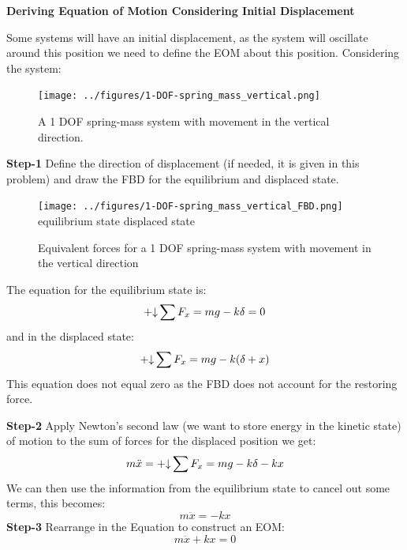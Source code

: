 \documentclass[12pt,letter]{article}
\begin{document}
		\begin{example}	

			\textbf{Deriving Equation of Motion Considering Initial Displacement}

			\noindent Some systems will have an initial displacement, as the system will oscillate around this position we need to define the EOM about this position. Considering the system:
			\begin{figure}[H]
				\centering
				\texttt{[image: ../figures/1-DOF-spring\_mass\_vertical.png]}
				\caption{A 1 DOF spring-mass system with movement in the vertical direction.}
			\end{figure}		
			\noindent \textbf{Step-1}
			Define the direction of displacement (if needed, it is given in this problem) and draw the FBD for the equilibrium and displaced state.  
			\begin{figure}[H]
				\centering
				\texttt{[image: ../figures/1-DOF-spring\_mass\_vertical\_FBD.png]}\\
				equilibrium state \hspace{3.6cm} displaced state
				\caption{Equivalent forces for a 1 DOF spring-mass system with movement in the vertical direction}
			\end{figure}		
			\noindent The equation for the equilibrium state is:
			\begin{equation}
				\mathbin{+\mathord\downarrow} \sum F_x = mg - k\delta = 0
			\end{equation}
			and in the displaced state:
			\begin{equation}
				\mathbin{+\mathord\downarrow} \sum F_x =mg -k(\delta + x)
			\end{equation}	
			This equation does not equal zero as the FBD does not account for the restoring force.	
			
			\noindent \textbf{Step-2} Apply Newton's second law (we want to store energy in the kinetic state) of motion to the sum of forces for the displaced position we get: 		
			\begin{equation}
				m\ddot{x} = \mathbin{+\mathord\downarrow} \sum F_x =mg -k\delta -kx
			\end{equation}
			We can then use the information from the equilibrium state to cancel out some terms, this becomes:
			\begin{equation}
				m\ddot{x} = -kx
			\end{equation}				
			\textbf{Step-3} Rearrange in the Equation to construct an EOM: 					
			\begin{equation}
				m\ddot{x} + kx = 0
			\end{equation}			
		\end{example}		
\end{document}
